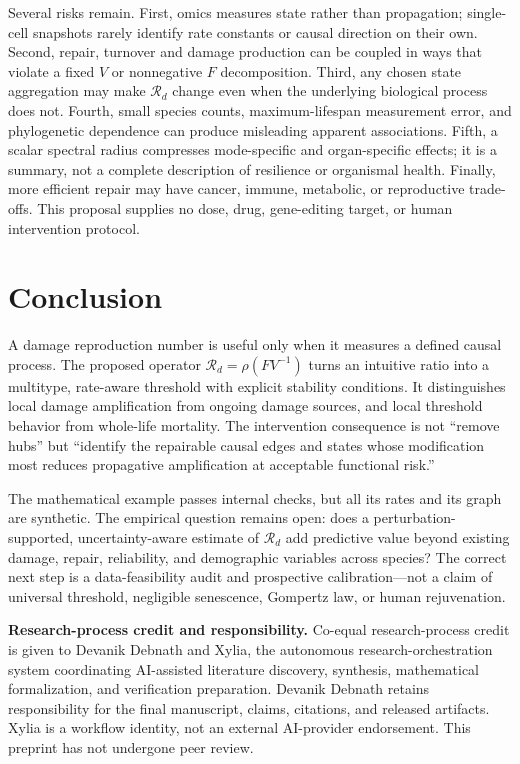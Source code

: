 \documentclass[11pt,a4paper]{article}
\newcommand{\Rd}{\mathcal{R}_{d}}
\begin{document}
Several risks remain. First, omics measures state rather than propagation; single-cell snapshots rarely identify rate constants or causal direction on their own. Second, repair, turnover and damage production can be coupled in ways that violate a fixed $V$ or nonnegative $F$ decomposition. Third, any chosen state aggregation may make $\Rd$ change even when the underlying biological process does not. Fourth, small species counts, maximum-lifespan measurement error, and phylogenetic dependence can produce misleading apparent associations. Fifth, a scalar spectral radius compresses mode-specific and organ-specific effects; it is a summary, not a complete description of resilience or organismal health. Finally, more efficient repair may have cancer, immune, metabolic, or reproductive trade-offs. This proposal supplies no dose, drug, gene-editing target, or human intervention protocol.

\section{Conclusion}
A damage reproduction number is useful only when it measures a defined causal process. The proposed operator $\Rd=\rho(FV^{-1})$ turns an intuitive ratio into a multitype, rate-aware threshold with explicit stability conditions. It distinguishes local damage amplification from ongoing damage sources, and local threshold behavior from whole-life mortality. The intervention consequence is not “remove hubs” but “identify the repairable causal edges and states whose modification most reduces propagative amplification at acceptable functional risk.”

The mathematical example passes internal checks, but all its rates and its graph are synthetic. The empirical question remains open: does a perturbation-supported, uncertainty-aware estimate of $\Rd$ add predictive value beyond existing damage, repair, reliability, and demographic variables across species? The correct next step is a data-feasibility audit and prospective calibration—not a claim of universal threshold, negligible senescence, Gompertz law, or human rejuvenation.

\vspace{0.5em}
\textbf{Research-process credit and responsibility.} Co-equal research-process credit is given to Devanik Debnath and Xylia, the autonomous research-orchestration system coordinating AI-assisted literature discovery, synthesis, mathematical formalization, and verification preparation. Devanik Debnath retains responsibility for the final manuscript, claims, citations, and released artifacts. Xylia is a workflow identity, not an external AI-provider endorsement. This preprint has not undergone peer review.
\end{document}
